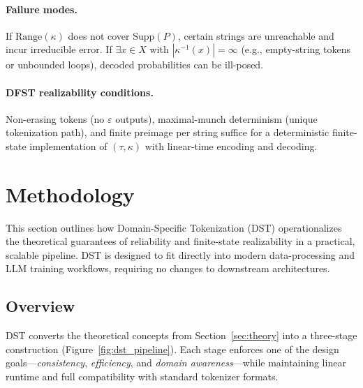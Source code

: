\paragraph{Failure modes.}
If $\mathrm{Range}(\kappa)$ does not cover $\mathrm{Supp}(P)$, certain strings are unreachable and incur irreducible error. If $\exists x\in X$ with $|\kappa^{-1}(x)|=\infty$ (e.g., empty-string tokens or unbounded loops), decoded probabilities can be ill-posed.

\paragraph{DFST realizability conditions.}
Non-erasing tokens (no $\varepsilon$ outputs), maximal-munch determinism (unique tokenization path), and finite preimage per string suffice for a deterministic finite-state implementation of $(\tau,\kappa)$ with linear-time encoding and decoding.

\section{Methodology}
\label{sec:method}

This section outlines how Domain-Specific Tokenization (DST) operationalizes the theoretical guarantees of reliability and finite-state realizability in a practical, scalable pipeline.
DST is designed to fit directly into modern data-processing and LLM training workflows, requiring no changes to downstream architectures.

\subsection{Overview}

DST converts the theoretical concepts from Section~\ref{sec:theory} into a three-stage construction (Figure~\ref{fig:dst_pipeline}).
Each stage enforces one of the design goals—\emph{consistency}, \emph{efficiency}, and \emph{domain awareness}—while maintaining linear runtime and full compatibility with standard tokenizer formats.

